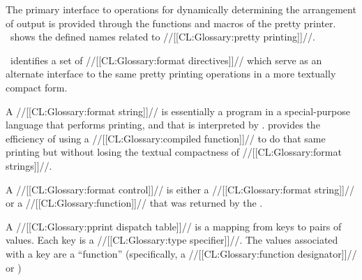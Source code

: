 The primary interface to operations for dynamically determining the
arrangement of output is provided through the functions and macros of the
pretty printer.  \Thenextfigure\ shows the defined names related to //[[CL:Glossary:pretty printing]]//.


\Thenextfigure\ identifies a set of //[[CL:Glossary:format directives]]// which serve
as an alternate interface to the same pretty printing operations in a 
more textually compact form.




 

\endsubsubsection%


A //[[CL:Glossary:format string]]// is essentially a program in a special-purpose language
that performs printing, and that is interpreted by .
 provides the efficiency of using a //[[CL:Glossary:compiled function]]// 
to do that same printing but without losing the textual compactness of //[[CL:Glossary:format strings]]//.

A //[[CL:Glossary:format control]]// is either a //[[CL:Glossary:format string]]// or a //[[CL:Glossary:function]]//
that was returned by the .


\endsubsubsection%

 




A //[[CL:Glossary:pprint dispatch table]]// is a mapping from keys to pairs of values.  
Each key is a //[[CL:Glossary:type specifier]]//.  
The values associated with a key are
     a ``function'' (specifically, a //[[CL:Glossary:function designator]]// or \nil)


